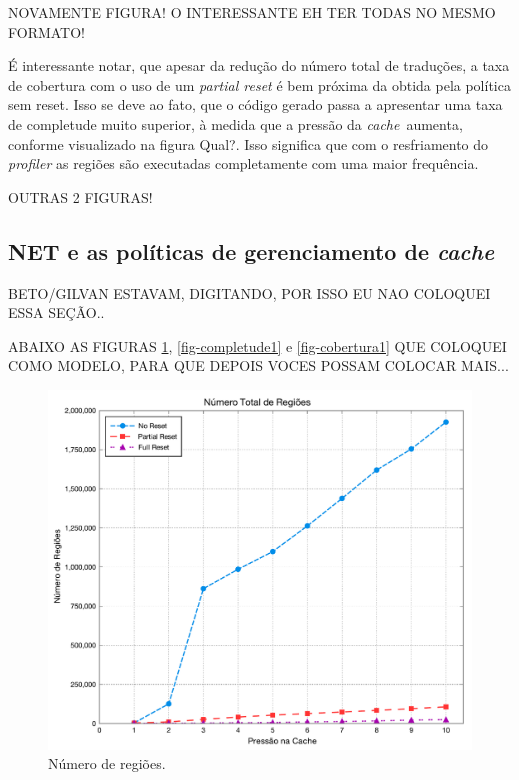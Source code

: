\documentclass[12pt,twoside]{article}
\newcommand{\cache}{\emph{cache}}
\begin{document}
\begin{large}
NOVAMENTE FIGURA! O INTERESSANTE EH TER TODAS NO MESMO FORMATO!
\end{large}


É interessante notar, que apesar da redução do número total de traduções, a taxa de cobertura com o uso de um \emph{partial reset} é bem próxima da obtida pela política sem reset. Isso se deve ao fato, que o código gerado passa a apresentar uma taxa de completude muito superior, à medida que a pressão da \cache~aumenta, conforme visualizado na figura {\large Qual?}. Isso significa que com o resfriamento do \emph{profiler} as regiões são executadas completamente com uma maior frequência.


\begin{large}
OUTRAS 2 FIGURAS!
\end{large}


\subsection{NET e as políticas de gerenciamento de \emph{cache}}
\begin{large}
BETO/GILVAN ESTAVAM, DIGITANDO, POR ISSO EU NAO COLOQUEI ESSA SEÇÃO..
\end{large}

\begin{large}
ABAIXO AS FIGURAS \ref{fig-num_regs}, \ref{fig-completude1} e \ref{fig-cobertura1} QUE COLOQUEI COMO MODELO, PARA QUE DEPOIS VOCES POSSAM COLOCAR MAIS...
\end{large}

\begin{figure}[!h!]
\includegraphics[scale=0.4]{./figs/regions-number}
\caption{Número de regiões.}
\label{fig-num_regs}
\end{figure}
\end{document}
